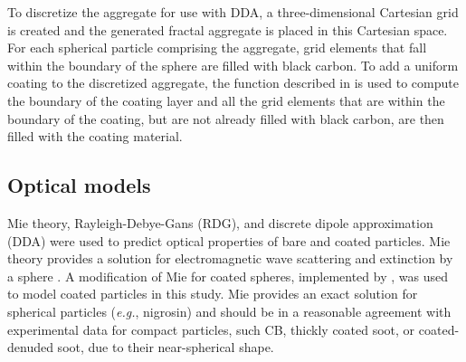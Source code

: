 To discretize the aggregate for use with DDA, a three-dimensional Cartesian grid is created and the generated fractal aggregate is placed in this Cartesian space. For each spherical particle comprising the aggregate, grid elements that fall within the boundary of the sphere are filled with black carbon. To add a uniform coating to the discretized aggregate, the function described in \citet{RN22} is used to compute the boundary of the coating layer and all the grid elements that are within the boundary of the coating, but are not already filled with black carbon, are then filled with the coating material.


\subsection{Optical models}

Mie theory, Rayleigh-Debye-Gans (RDG),  and discrete dipole approximation (DDA) were used to predict optical properties of bare and coated particles. Mie theory provides a solution for electromagnetic wave scattering and extinction by a sphere \citep{RN1}. A modification of Mie for coated spheres, implemented by \cite{RN19}, was used to model coated particles in this study. Mie provides an exact solution for spherical particles (\textit{e.g.}, nigrosin) and should be in a reasonable agreement with experimental data for compact particles, such CB, thickly coated soot, or coated-denuded soot, due to their near-spherical shape.

